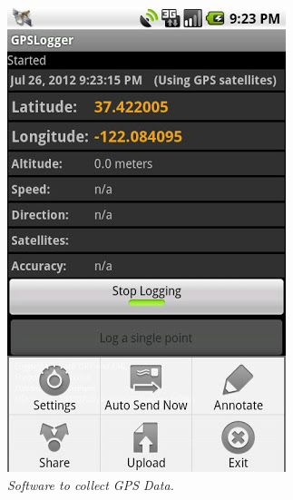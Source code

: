 \documentclass[10pt]{sigplan-proc-varsize}
\begin{document}
\begin{figure}
\begin{center}
\includegraphics[scale=0.45]{gpsLogger.png}
\caption{\small \sl Software to collect GPS Data.\label{fig:gpsLogger}}
\end{center}
\end{figure}
\end{document}
